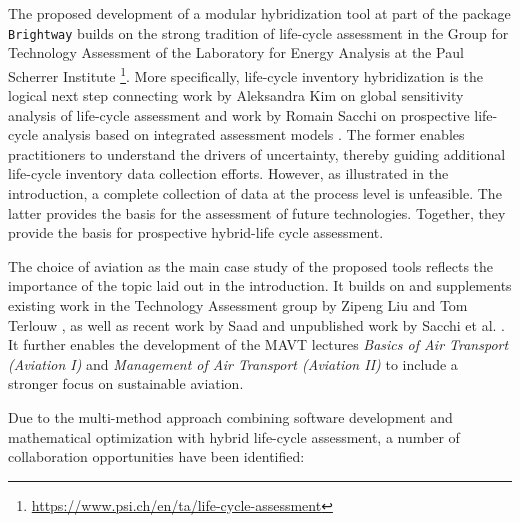 \documentclass{article}
\begin{document}
    The proposed development of a modular hybridization tool at part of the package \texttt{Brightway} builds on the strong tradition of life-cycle assessment in the Group for Technology Assessment of the Laboratory for Energy Analysis at the Paul Scherrer Institute \footnote{\url{https://www.psi.ch/en/ta/life-cycle-assessment}}. More specifically, life-cycle inventory hybridization is the logical next step connecting work by Aleksandra Kim on global sensitivity analysis of life-cycle assessment \cite{kim_aleksandra-kimgwp_uncertainties_2022}\cite{kim_aleksandra-kimgsa_framework_2021}\cite{paulillo_influential_2021} and work by Romain Sacchi on prospective life-cycle analysis based on integrated assessment models \cite{noauthor_premise_2022}\cite{sacchi_prospective_2022}. The former enables practitioners to understand the drivers of uncertainty, thereby guiding additional life-cycle inventory data collection efforts. However, as illustrated in the introduction, a complete collection of data at the process level is unfeasible. The latter provides the basis for the assessment of future technologies. Together, they provide the basis for prospective hybrid-life cycle assessment. 
    
    The choice of aviation as the main case study of the proposed tools reflects the importance of the topic laid out in the introduction. It builds on and supplements existing work in the Technology Assessment group by Zipeng Liu and Tom Terlouw \cite{terlouw_large-scale_2022}, as well as recent work by Saad \cite{saad_synthetic_2022} and unpublished work by Sacchi et al. \cite{sacchi_climate-neutral_2022}. It further enables the development of the MAVT lectures \textit{Basics of Air Transport (Aviation I)} and \textit{Management of Air Transport (Aviation II)} to include a stronger focus on sustainable aviation.
    
    Due to the multi-method approach combining software development and mathematical optimization with hybrid life-cycle assessment, a number of collaboration opportunities have been identified:
	
\end{document}
